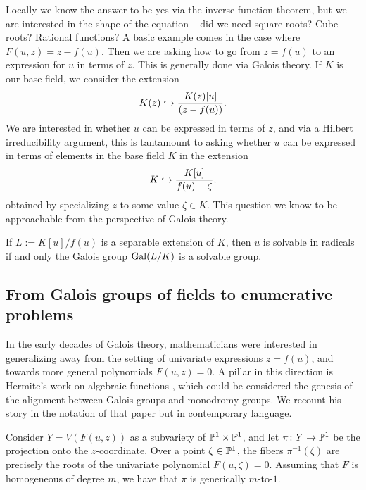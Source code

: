 \documentclass[11pt]{amsart}
\begin{document}
Locally we know the answer to be yes via the inverse function theorem, but we are interested in the shape of the equation -- did we need square roots? Cube roots? Rational functions? A basic example comes in the case where $F(u,z) = z-f(u)$. Then we are asking how to go from $z = f(u)$ to an expression for $u$ in terms of $z$. This is generally done via Galois theory. If $K$ is our base field, we consider the extension
\begin{align*}
    K(z) \hookto \frac{K(z)[u]}{(z-f(u))}.
\end{align*}
We are interested in whether $u$ can be expressed in terms of $z$, and via a Hilbert irreducibility argument, this is tantamount to asking whether $u$ can be expressed in terms of elements in the base field $K$ in the extension
\begin{align*}
    K \hookto \frac{K[u]}{f(u)-\zeta},
\end{align*}
obtained by specializing $z$ to some value $\zeta\in K$. This question we know to be approachable from the perspective of Galois theory.

\begin{theorem}[Galois] If $L :=K[u]/f(u)$ is a separable extension of $K$, then $u$ is solvable in radicals if and only the Galois group $\Gal(L/ K)$ is a solvable group.
\end{theorem}

\subsection{From Galois groups of fields to enumerative problems}

In the early decades of Galois theory, mathematicians were interested in generalizing  away from the setting of univariate expressions $z = f(u)$, and towards more general polynomials $F(u,z) = 0$. A pillar in this direction is Hermite's work on algebraic functions \cite{Hermite51}, which could be considered the genesis of the alignment between Galois groups and monodromy groups. We recount his story in the notation of that paper but in contemporary language.

Consider $Y = V(F(u,z))$ as a subvariety of $\P^1 \times \P^1$, and let $\pi \colon Y \to \P^1$ be the projection onto the $z$-coordinate. Over a point $\zeta\in \P^1$, the fibers $\pi^{-1}(\zeta)$ are precisely the roots of the univariate polynomial $F(u,\zeta)=0$. Assuming that $F$ is homogeneous of degree $m$, we have that $\pi$ is generically $m$-to-$1$.
\end{document}
